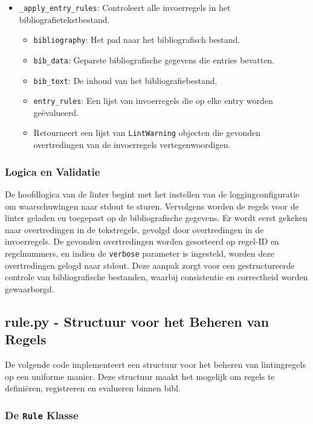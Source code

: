 \begin{itemize}
    \item \texttt{\_apply\_entry\_rules}:
    Controleert alle invoerregels in het bibliografietekstbestand.
    \begin{itemize}
        \item \texttt{bibliography}: Het pad naar het bibliografisch bestand.
        \item \texttt{bib\_data}: Geparste bibliografische gegevens die entries bevatten.
        \item \texttt{bib\_text}: De inhoud van het bibliografiebestand.
        \item \texttt{entry\_rules}: Een lijst van invoerregels die op elke entry worden geëvalueerd.
        \item Retourneert een lijst van \texttt{LintWarning} objecten die gevonden overtredingen van de invoerregels vertegenwoordigen.
    \end{itemize}
\end{itemize}

\subsubsection{Logica en Validatie}

De hoofdlogica van de linter begint met het instellen van de loggingconfiguratie om waarschuwingen naar stdout te sturen. Vervolgens worden de regels voor de linter geladen en toegepast op de bibliografische gegevens. Er wordt eerst gekeken naar overtredingen in de tekstregels, gevolgd door overtredingen in de invoerregels. De gevonden overtredingen worden gesorteerd op regel-ID en regelnummers, en indien de \texttt{verbose} parameter is ingesteld, worden deze overtredingen gelogd naar stdout. Deze aanpak zorgt voor een gestructureerde controle van bibliografische bestanden, waarbij consistentie en correctheid worden gewaarborgd.

\subsection{rule.py - Structuur voor het Beheren van Regels}

De volgende code implementeert een structuur voor het beheren van lintingregels op een uniforme manier. Deze structuur maakt het mogelijk om regels te definiëren, registreren en evalueren binnen bibl.

\subsubsection{De \texttt{Rule} Klasse}

